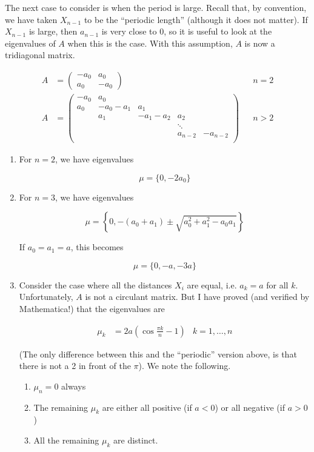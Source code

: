 \documentclass[12pt]{article}
\begin{document}
The next case to consider is when the period is large. Recall that, by convention, we have taken $X_{n-1}$ to be the ``periodic length'' (although it does not matter). If $X_{n-1}$ is large, then $a_{n-1}$ is very close to 0, so it is useful to look at the eigenvalues of $A$ when this is the case. With this assumption, $A$ is now a tridiagonal matrix. 

\begin{align*}
A &= \begin{pmatrix}
-a_0 & a_0 \\
a_0 & -a_0 
\end{pmatrix} && n = 2 \\
A &= \begin{pmatrix}
- a_0 & a_0 & & &  \\
a_0 & -a_0 - a_1 &  a_1 \\
& a_1 & -a_1 - a_2 &  a_2 \\
& & & \ddots \\
& & & a_{n-2} & -a_{n-2} \\
\end{pmatrix} && n > 2
\end{align*}

\begin{enumerate}

\item For $n = 2$, we have eigenvalues

\[
\mu = \{ 0, -2 a_0 \}
\]

\item For $n = 3$, we have eigenvalues

\[
\mu = \left\{ 0,  -(a_0 + a_1) \pm 
\sqrt{a_0^2 + a_1^2 - a_0 a_1} \right\}
\]

If $a_0 = a_1 = a$, this becomes

\[
\mu = \{0,  -a, -3a \}
\]

\item Consider the case where all the distances $X_i$ are equal, i.e. $a_k = a$ for all $k$. Unfortunately, $A$ is not a circulant matrix. But I have proved (and verified by Mathematica!) that the eigenvalues are 

\begin{align*}
\mu_k &= 2 a\left( \cos \frac{\pi k}{n}  - 1 \right) & k = 1, \dots, n
\end{align*}

(The only difference between this and the ``periodic'' version above, is that there is not a 2 in front of the $\pi$). We note the following.

\begin{enumerate}
	\item $\mu_n = 0$ always
	\item The remaining $\mu_k$ are either all positive (if $a < 0$) or all negative (if $a > 0$)
	\item All the remaining $\mu_k$ are distinct. 
\end{enumerate}

\end{enumerate}
\end{document}
